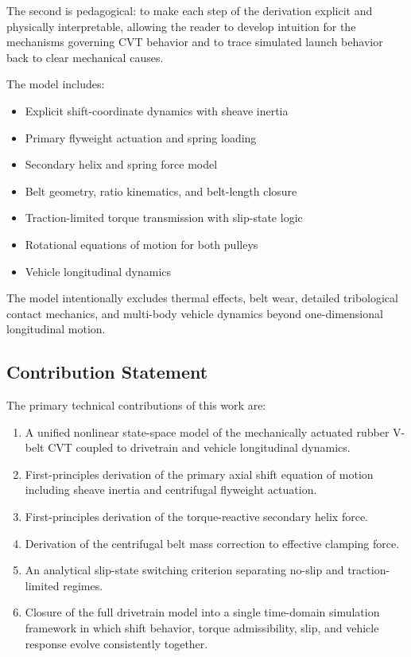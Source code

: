 \documentclass[11pt]{article}
\numberwithin{equation}{section}
\begin{document}
The second is pedagogical: to make each step of the derivation explicit and
physically interpretable, allowing the reader to develop intuition for the
mechanisms governing CVT behavior and to trace simulated launch behavior back
to clear mechanical causes.

The model includes:

\begin{itemize}
\item Explicit shift-coordinate dynamics with sheave inertia
\item Primary flyweight actuation and spring loading
\item Secondary helix and spring force model
\item Belt geometry, ratio kinematics, and belt-length closure
\item Traction-limited torque transmission with slip-state logic
\item Rotational equations of motion for both pulleys
\item Vehicle longitudinal dynamics
\end{itemize}

The model intentionally excludes thermal effects, belt wear, detailed
tribological contact mechanics, and multi-body vehicle dynamics beyond
one-dimensional longitudinal motion.

\subsection{Contribution Statement}
\label{sec:intro_contributions}

The primary technical contributions of this work are:

\begin{enumerate}
\item A unified nonlinear state-space model of the mechanically actuated
rubber V-belt CVT coupled to drivetrain and vehicle longitudinal dynamics.

\item First-principles derivation of the primary axial shift equation of
motion including sheave inertia and centrifugal flyweight actuation.

\item First-principles derivation of the torque-reactive secondary helix force.

\item Derivation of the centrifugal belt mass correction to effective clamping
force.

\item An analytical slip-state switching criterion separating no-slip and
traction-limited regimes.

\item Closure of the full drivetrain model into a single time-domain
simulation framework in which shift behavior, torque admissibility, slip,
and vehicle response evolve consistently together.
\end{enumerate}
\end{document}
